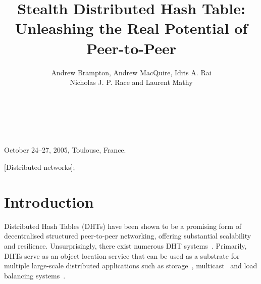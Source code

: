 \documentclass{sig-alt-release2}
\begin{document}
 {October 24--27, 2005, Toulouse,
France.}

\title{
  Stealth Distributed Hash Table:\\
  Unleashing the Real Potential of Peer-to-Peer
}


\author {
  \alignauthor Andrew Brampton, Andrew MacQuire, Idris A. Rai\\ Nicholas J. P. Race and Laurent Mathy\\
  \\
  \\
  \\
}

\maketitle


[Distributed networks];\\



\section{Introduction}
\label{sect:intro}

Distributed Hash Tables (DHTs) have been shown to be a promising
form of decentralised structured peer-to-peer networking, offering
substantial scalability and resilience. Unsurprisingly, there exist
numerous DHT systems~\cite{can01}\cite{pastry01}\cite{chord01}.
Primarily, DHTs serve as an object location service that can be used
as a substrate for multiple large-scale distributed applications
such as storage~\cite{past}\cite{oceanstore},
multicast~\cite{scribe}\cite{split} and load balancing
systems~\cite{kar04}\cite{bri05}.
\end{document}
